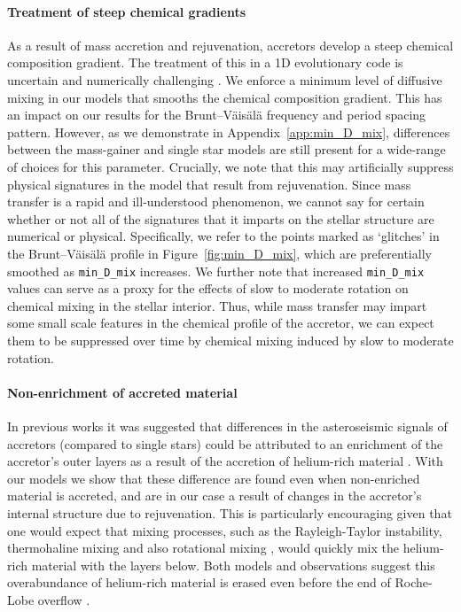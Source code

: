 \documentclass[desactivate]{aa}
\newcommand{\referee}[1]{{#1}}
\begin{document}
\paragraph{Treatment of steep chemical gradients} As a result of mass accretion and rejuvenation, accretors develop a steep chemical composition gradient. The treatment of this in a 1D evolutionary code is uncertain and numerically challenging \citep[e.g.\ ][]{Lau+2014:2014A&A...570A.125L}. We enforce a minimum level of diffusive mixing in our models that smooths the chemical composition gradient. This has an impact on our results for the Brunt–Väisälä frequency and period spacing pattern. However, as we demonstrate in Appendix~\ref{app:min_D_mix}, differences between the mass-gainer and single star models are still present for a wide-range of choices for this parameter. Crucially, we note that this may artificially suppress physical signatures in the model that result from rejuvenation. Since mass transfer is a rapid and ill-understood phenomenon, we cannot say for certain whether or not all of the signatures that it imparts on the stellar structure are numerical or physical. Specifically, we refer to the points marked as `glitches' in the Brunt–Väisälä profile in Figure~\ref{fig:min_D_mix}, which are preferentially smoothed as \texttt{min\_D\_mix} increases. We further note that increased \texttt{min\_D\_mix} values can serve as a proxy for the effects of slow to moderate rotation on chemical mixing in the stellar interior. Thus, while mass transfer may impart some small scale features in the chemical profile of the accretor, we can expect them to be suppressed over time by chemical mixing induced by slow to moderate rotation.

\referee{\paragraph{Non-enrichment of accreted material} In previous works it was suggested that differences in the asteroseismic signals of accretors (compared to single stars) could be attributed to an enrichment of the accretor's outer layers as a result of the accretion of helium-rich material \citep[e.g.][]{Miszuda+2021}. With our models we show that these difference are found even when non-enriched material is accreted, and are in our case a result of changes in the accretor's internal structure due to rejuvenation. This is particularly encouraging given that one would expect that mixing processes, such as the Rayleigh-Taylor instability, thermohaline mixing and also rotational mixing \citep{Kippenhahn+1980, Cantiello+2007}, would quickly mix the helium-rich material with the layers below. Both models and observations suggest this overabundance of helium-rich material is erased even before the end of Roche-Lobe overflow \citep{Renzo+2021}.}
\end{document}
